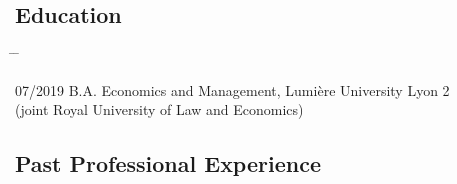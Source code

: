 \documentclass[10pt,a4paper]{article}
\newcommand{\tabbedblock}[1]{

	\begin{tabbing}
		\hspace{3cm} \= \hspace{4cm} \= \kill
		#1
	\end{tabbing}
}
\begin{document}
\subsection*{Education}

\tabbedblock{
	07/2019 \> B.A. Economics and Management, Lumière University Lyon 2\\
	\>(joint Royal University of Law and Economics)
}

\subsection*{Past Professional Experience}	
\end{document}
